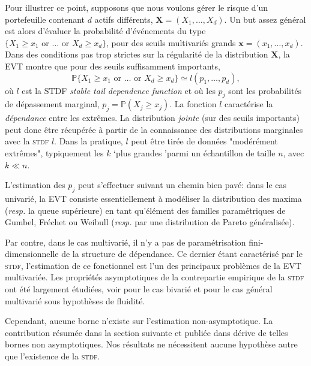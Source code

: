 \documentclass[a4paper, 12pt]{article}
\def\mb{\mathbf}
\def\P{\mathbb{P}}
\begin{document}
Pour illustrer ce point, supposons que nous voulons gérer le risque d'un portefeuille contenant $ d $ actifs différents, $ \mb X = (X_1, \ldots, X_d) $. Un but assez général est alors d'évaluer la probabilité d'événements du type
 $\{X_1 \ge x_1 \text{ or }  \dotsc \text{ or } X_d\ge x_d \}$, 
pour des seuils multivariés grands $\mb x=(x_1,\ldots,x_d)$. Dans des conditions pas trop strictes sur la régularité de la distribution $ \mb X $, la \textsc {EVT} montre que pour des seuils suffisamment importants,
\[
\P\{X_1 \ge x_1 \text{ or }  \dotsc \text{ or }
X_d\ge x_d \} \simeq 
l(p_1,\ldots,p_d), 
\] 
où $ l $ est la STDF \emph{stable tail dependence function} et où les $ p_j $  sont les probabilités de dépassement marginal, $ p_j = \P (X_j \ge x_j) $. La fonction $ l $ caractérise la \emph {dépendance} entre les extrêmes. La distribution \emph {jointe} (sur des seuils importants) peut donc être récupérée à partir de la connaissance des distributions marginales avec la \textsc {stdf} $ l $. Dans la pratique, $ l $ peut être tirée de données "modérément extrêmes", typiquement les $ k $ `plus grandes 'parmi un échantillon de taille $ n $, avec $ k \ll n $.

L'estimation des $ p_j $ peut s'effectuer suivant un chemin bien pavé: dans le cas univarié, la \textsc {EVT} consiste essentiellement à modéliser la distribution des maxima (\emph {resp.} la queue supérieure) en tant qu'élément des familles paramétriques de Gumbel, Fréchet ou Weibull (\emph {resp.} par une distribution de Pareto généralisée).

Par contre, dans le cas multivarié, il n'y a pas de paramétrisation fini-dimensionnelle de la structure de dépendance.
Ce dernier étant caractérisé par le \textsc {stdf}, l'estimation de ce fonctionnel est l'un des principaux problèmes de la \textsc {EVT} multivariée. Les propriétés asymptotiques de la contrepartie empirique de la \textsc {stdf} ont été largement étudiées, voir \cite {Huangphd, Drees98, Embrechts2000, dHF06} pour le cas bivarié et \cite {Qi97, Einmahl2012} pour le cas général multivarié sous hypothèses de fluidité.

Cependant, aucune borne n'existe sur l'estimation non-asymptotique. La contribution résumée dans la section suivante et publiée dans \cite{COLT15} dérive de telles bornes non asymptotiques. Nos résultats ne nécessitent aucune hypothèse autre que l'existence de la \textsc {stdf}.
\end{document}
